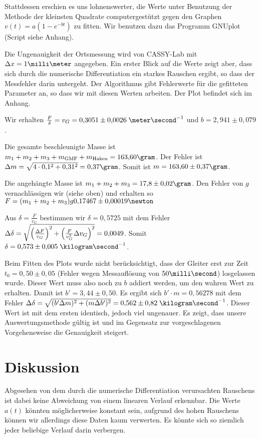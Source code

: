 \documentclass[a4paper,german,12pt,smallheadings]{scrartcl}
\begin{document}
Stattdessen erschien es uns lohnenswerter, die Werte unter Benutzung der
Methode der kleinsten Quadrate computergestützt gegen den Graphen $v(t) = a (1
- e^{-bt})$ zu fitten. Wir benutzen dazu das Programm GNUplot (Script siehe
Anhang).

Die Ungenauigkeit der Ortsmessung wird von CASSY-Lab mit $\Delta x = 1
\milli\meter$ angegeben. Ein erster Blick auf die Werte zeigt aber, dass sich
durch die numerische Differentiation ein starkes Rauschen ergibt, so dass der
Messfehler darin untergeht. Der Algorithmus gibt Fehlerwerte für die gefitteten
Parameter an, so dass wir mit diesen Werten arbeiten. Der Plot befindet sich im
Anhang.

Wir erhalten $\frac{F}{\delta} = v_G = 0{,}3051\pm0{,}0026
\;\meter\second^{-1}$ und $b = 2{,}941\pm0{,}079$.

Die gesamte beschleunigte Masse ist $m_1 + m_2 + m_3 + m_\text{GMF} +
m_\text{Haken} = 163{,}60 \gram$. Der Fehler ist $\Delta m = \sqrt{4 \cdot
0{,}1^2 + 0{,}31^2} = 0{,}37 \gram$. Somit ist $m = 163{,}60 \pm 0{,}37 \gram$.

Die angehängte Masse ist $m_1 + m_2 + m_3 = 17{,}8 \pm 0{,}02 \gram$. Den
Fehler von $g$ vernachlässigen wir (siehe oben) und erhalten so $F = (m_1 + m_2
+ m_3) g 0{,}17467\pm 0{,}00019 \newton$

Aus $\delta = \frac{F}{v_G}$ bestimmen wir $\delta = 0{,}5725$ mit dem Fehler
$\Delta \delta = \sqrt{\del{\frac{\Delta F}{v_G}}^2 + \del{\frac{F}{v_G^2}
\Delta v_G}^2} = 0{,}0049$. Somit $\delta =  0{,}573\pm0{,}005 \;
\kilogram\second^{-1}$.

Beim Fitten des Plots wurde nicht berücksichtigt, dass der Gleiter erst zur
Zeit $t_0 = 0{,}50 \pm 0{,}05$ (Fehler wegen Messauflösung von $50
\milli\second$) losgelassen wurde. Dieser Wert muss also noch zu $b$ addiert
werden, um den wahren Wert zu erhalten. Damit ist $b' = 3{,}44 \pm 0{,}50$. Es
ergibt sich $b' \cdot m = 0{,}56278$ mit dem Fehler $\Delta \delta = \sqrt{(b'
\Delta m)^2 + (m \Delta b')^2} = 0{,}562\pm0{,}82 \; \kilogram\second^{-1}$.
Dieser Wert ist mit dem ersten identisch, jedoch viel ungenauer. Es zeigt, dass
unsere Auswertungsmethode gültig ist und im Gegensatz zur vorgeschlagenen
Vorgehensweise die Genauigkeit steigert.

\section*{Diskussion}
Abgesehen
von dem durch die numerische Differentiation verursachten Rauschens ist dabei
keine Abweichung von einem linearen Verlauf erkennbar. Die Werte $a(t)$ könnten
möglicherweise konstant sein, aufgrund des hohen Rauschens können wir
allerdings diese Daten kaum verwerten. Es könnte sich so ziemlich jeder
beliebige Verlauf darin verbergen.
\end{document}
